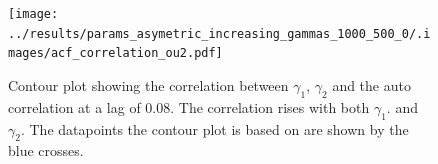 \documentclass[a4paper,12pt,oneside]{book}
\theoremstyle{break}
\begin{document}
\begin{figure}
	\texttt{[image: ../results/params\_asymetric\_increasing\_gammas\_1000\_500\_0/.images/acf\_correlation\_ou2.pdf]}%
	\caption{Contour plot showing the correlation between $\gamma_1$, $\gamma_2$ and the auto correlation at a lag of 0.08. The correlation rises with both $\gamma_1$. and $\gamma_2$. The datapoints  the contour plot is based on are shown by the blue crosses.}%
	\label{f/a/acf_white_asym_correlation_gamma_ou2}
\end{figure}


\appendix




\clearpage


\thispagestyle{empty}
\end{document}
